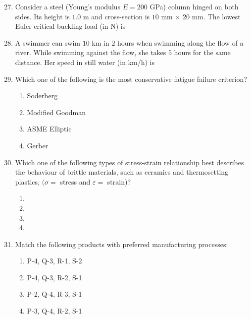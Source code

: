 \documentclass[journal,9pt,onecolumn]{IEEEtran}
\begin{document}
\begin{enumerate}
\setcounter{enumi}{26}
\item Consider a steel (Young's modulus $E = 200$ GPa) column hinged on both sides. Its height is $1.0$ m and cross-section is $10$ mm $\times$ $20$ mm. The lowest Euler critical buckling load (in N) is


\item A swimmer can swim $10$ km in $2$ hours when swimming along the flow of a river. While swimming against the flow, she takes $5$ hours for the same distance. Her speed in still water (in km/h) is


\item Which one of the following is the most conservative fatigue failure criterion?
\begin{multicols}{4}
\begin{enumerate}
    \item Soderberg
    \item Modified Goodman
    \item ASME Elliptic
    \item Gerber
\end{enumerate}
\end{multicols}

\item Which one of the following types of stress-strain relationship best describes the behaviour of brittle materials, such as ceramics and thermosetting plastics, $(\sigma =$ stress and  $\varepsilon =$ strain)?

\begin{multicols}{2}
\begin{enumerate}
    \item 
    \item 
    \item 
    \item 
\end{enumerate}
\end{multicols}




\item Match the following products with preferred manufacturing processes:
\begin{table}[h!]
    \centering
    
    \label{tab:ME-2015}
\end{table}
\begin{multicols}{4}
\begin{enumerate}
    \item P-4, Q-3, R-1, S-2
    \item P-4, Q-3, R-2, S-1
    \item P-2, Q-4, R-3, S-1
    \item P-3, Q-4, R-2, S-1
\end{enumerate}
\end{multicols}



\end{enumerate}
\end{document}
